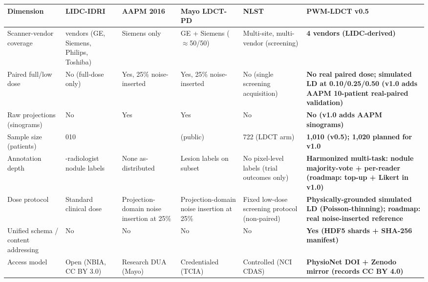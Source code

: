 \documentclass[twoside,11pt]{article}
\begin{document}
\begin{table}[ht]
    \centering
    \scriptsize
    \setlength{\tabcolsep}{3pt}
    \begin{tabular}{@{}>{\raggedright\arraybackslash}p{2.2cm} >{\raggedright\arraybackslash}p{3.1cm} >{\raggedright\arraybackslash}p{2.7cm} >{\raggedright\arraybackslash}p{3.0cm} >{\raggedright\arraybackslash}p{2.9cm} >{\raggedright\arraybackslash}p{2.9cm}@{}}
        \toprule
        \textbf{Dimension} & \textbf{LIDC-IDRI}~\citep{lidc_idri} & \textbf{AAPM 2016}~\citep{aapm2016challenge} & \textbf{Mayo LDCT-PD}~\citep{mccollough2020mayo} & \textbf{NLST}~\citep{nlst2011,nlst_data} & \textbf{PWM-LDCT v0.5} \\
        \midrule
        Scanner-vendor coverage & 4 vendors (GE, Siemens, Philips, Toshiba) & Siemens only & GE + Siemens ($\approx$50/50) & Multi-site, multi-vendor (screening) & \textbf{4 vendors (LIDC-derived)} \\
        Paired full/low dose & No (full-dose only) & Yes, 25\% noise-inserted & Yes, 25\% noise-inserted & No (single screening acquisition) & \textbf{No real paired dose; simulated LD at 0.10/0.25/0.50 (v1.0 adds AAPM 10-patient real-paired validation)} \\
        Raw projections (sinograms) & No & Yes & Yes & No & \textbf{No (v1.0 adds AAPM sinograms)} \\
        Sample size (patients) & 1{,}010 & 10 & 199 (public) & 26{,}722 (LDCT arm) & \textbf{1{,}010 (v0.5); 1{,}020 planned for v1.0} \\
        Annotation depth & 4-radiologist nodule labels & None as-distributed & Lesion labels on subset & No pixel-level labels (trial outcomes only) & \textbf{Harmonized multi-task: nodule majority-vote + per-reader (roadmap: top-up + Likert in v1.0)} \\
        Dose protocol & Standard clinical dose & Projection-domain noise insertion at 25\% & Projection-domain noise insertion at 25\% & Fixed low-dose screening protocol (non-paired) & \textbf{Physically-grounded simulated LD (Poisson-thinning); roadmap: real noise-inserted reference} \\
        Unified schema / content addressing & No & No & No & No & \textbf{Yes (HDF5 shards + SHA-256 manifest)} \\
        Access model & Open (NBIA, CC BY 3.0) & Research DUA (Mayo) & Credentialed (TCIA) & Controlled (NCI CDAS) & \textbf{PhysioNet DOI + Zenodo mirror (records CC BY 4.0)} \\
        \bottomrule

\end{tabular}
\end{table}
\end{document}

